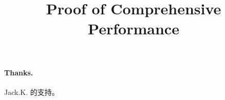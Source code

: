 \documentclass[10pt,twocolumn,letterpaper]{article}
\numberwithin{equation}{section}
\begin{document}

\newcommand{\figref}[1]{图\ref{#1}}
\newcommand{\tabref}[1]{表\ref{#1}}
\newcommand{\equref}[1]{式\ref{#1}}
\newcommand{\secref}[1]{第\ref{#1}节}
\renewcommand{\figurename}{fig}

\title{Proof of Comprehensive Performance}

\iffalse
\author{Yubo Wang$^{1}$\quad Yang Zhang$^{1}$\quad Chenhe Zhang$^{2}$\\
    $^{1}$ Harbin Engineering University \quad \quad
    $^2$ Zhejiang University}
\fi

\maketitle






\paragraph{Thanks.} Jack.K. 的支持。

{\small


}

\appendix



\end{document}
